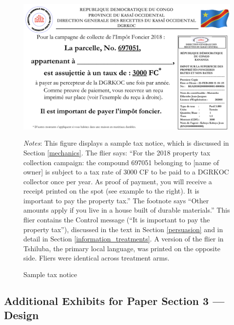 \documentclass[12pt,english]{article}
\renewcommand{\footnotesize}{\fontsize{9pt}{11pt}\selectfont}\usepackage[unicode=true,
\begin{document}

\begin{figure}[H]
\centering{}\caption{Sample tax notice \label{fig:flyerPG_L}}
\includegraphics[scale=0.5]{Documents/flier3000control.png} 
\usebox{\tablebox}\\[1ex]
\parbox{6in}{\footnotesize \textit{Notes}: This figure displays a sample tax notice, which is discussed in Section \ref{mechanics}. The flier says: ``For the 2018 property tax collection campaign: the compound 697051 belonging to [name of owner] is subject to a tax rate of 3000 CF to be paid to a DGRKOC collector once per year. As proof of payment, you will receive a receipt printed on the spot (see example to the right). It is important to pay the property tax.'' The footnote says ``Other amounts apply if you live in a house built of durable materials.'' This flier contains the Control message (``It is important to pay the property tax''), discussed in the text in Section \ref{persuasion} and in detail in Section \ref{information_treatments}. A version of the flier in Tshiluba, the primary local language, was printed on the opposite side. Fliers were identical across treatment arms.}
\end{figure}


\subsection{Additional Exhibits for Paper Section 3 --- Design}

\end{document}
